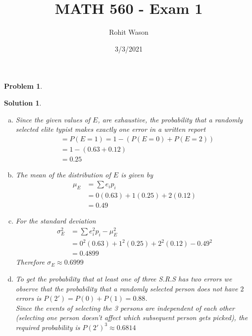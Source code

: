 \documentclass{article}
\author{Rohit Wason}
\title{MATH 560 - Exam 1}
\date{3/3/2021}
\newtheorem{problem}{Problem}
\newtheorem*{solution*}{Solution}
\begin{document}
\maketitle
 
\begin{problem}
\end{problem}
\begin{solution*}
  \begin{enumerate}[(a)]
    \item Since the given values of $E$, are exhaustive, 
    the probability that a randomly selected elite typist makes exactly one error in a
    written report
    \begin{align*}
      &=P(E=1) = 1-(P(E=0)+P(E=2))\\
      &=1-(0.63+0.12)\\
      &=\boxed{0.25}
    \end{align*}

    \item The mean of the distribution of $E$ is given by
    \begin{align*}
      \mu_E &= \sum{e_ip_i}\\
      &= 0(0.63)+1(0.25)+2(0.12)\\
      &= \boxed{0.49}
    \end{align*}

    \item For the standard deviation
    \begin{align*}
      \sigma_E^2 &= \sum{e_i^2p_i} - \mu_E^2\\
      &= 0^2(0.63)+1^2(0.25)+2^2(0.12) - 0.49^2\\
      &= \boxed{0.4899}
    \end{align*}
    Therefore $\sigma_E\approx{0.6999}$

    \item To get the probability that at least one of three S.R.S has two errors
    we observe that the probability that a randomly selected person does not have $2$ errors is
    $P(2')=P(0)+P(1)=0.88$.\\

    Since the events of selecting the 3 persons are independent of each other
    (selecting one person doesn’t affect which subsequent person gets picked), the
    required probability is $P(2')^3\approx{\boxed{0.6814}}$
  \end{enumerate}
\end{solution*}
\end{document}
